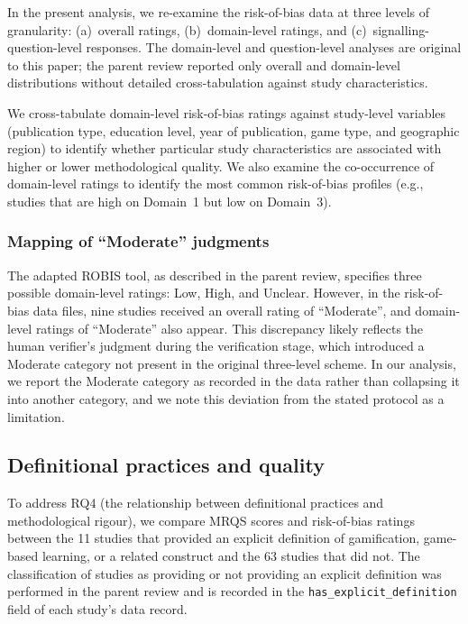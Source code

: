 \documentclass[etq]{acnsart}
\begin{document}
	In the present analysis, we re-examine the risk-of-bias data at three levels of granularity: (a)~overall ratings, (b)~domain-level ratings, and (c)~signalling-question-level responses. The domain-level and question-level analyses are original to this paper; the parent review reported only overall and domain-level distributions without detailed cross-tabulation against study characteristics.
	
	We cross-tabulate domain-level risk-of-bias ratings against study-level variables (publication type, education level, year of publication, game type, and geographic region) to identify whether particular study characteristics are associated with higher or lower methodological quality. We also examine the co-occurrence of domain-level ratings to identify the most common risk-of-bias profiles (e.g., studies that are high on Domain~1 but low on Domain~3).
	
	\subsubsection{Mapping of ``Moderate'' judgments}
	\label{sec:methods_moderate}
	
	The adapted ROBIS tool, as described in the parent review, specifies three possible domain-level ratings: Low, High, and Unclear. However, in the risk-of-bias data files, nine studies received an overall rating of ``Moderate'', and domain-level ratings of ``Moderate'' also appear. This discrepancy likely reflects the human verifier's judgment during the verification stage, which introduced a Moderate category not present in the original three-level scheme. In our analysis, we report the Moderate category as recorded in the data rather than collapsing it into another category, and we note this deviation from the stated protocol as a limitation.
	
	\subsection{Definitional practices and quality}
	\label{sec:methods_definitions}
	
	To address RQ4 (the relationship between definitional practices and methodological rigour), we compare MRQS scores and risk-of-bias ratings between the 11 studies that provided an explicit definition of gamification, game-based learning, or a related construct and the 63 studies that did not. The classification of studies as providing or not providing an explicit definition was performed in the parent review and is recorded in the \texttt{has\_explicit\_definition} field of each study's data record.
	
\end{document}
